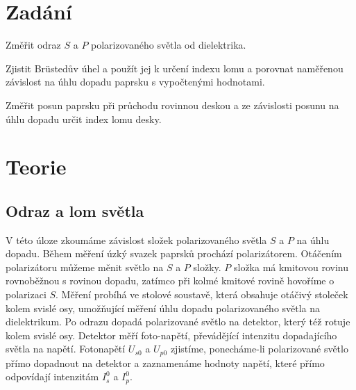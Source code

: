 \documentclass[a4paper,11pt]{article}
\begin{document}
\vskip1cm
    \begin{minipage}[t]{0.5\textwidth} 
    \section{Zadání}
    Změřit odraz $S$ a $P$ polarizovaného světla od dielektrika.
    \par Zjistit Brüstedův úhel a použít jej k určení indexu lomu a porovnat naměřenou závislost na úhlu dopadu paprsku s vypočtenými hodnotami.
    \par Změřit posun paprsku při průchodu rovinnou deskou a ze závislosti posunu na úhlu dopadu určit index lomu desky.
    \section{Teorie}
        \subsection{Odraz a lom světla}
            V této úloze zkoumáme závislost složek polarizovaného světla $S$ a $P$ na úhlu dopadu. Během měření úzký svazek paprsků prochází polarizátorem. Otáčením polarizátoru můžeme měnit světlo na $S$ a $P$ složky. $P$ složka má kmitovou rovinu rovnoběžnou s rovinou dopadu, zatímco při kolmé kmitové rovině hovoříme o polarizaci $S$. Měření probíhá ve stolové soustavě, která obsahuje otáčivý stoleček kolem svislé osy, umožňující měření úhlu dopadu polarizovaného světla na dielektrikum. Po odrazu dopadá polarizované světlo na detektor, který též rotuje kolem svislé osy. Detektor měří foto-napětí, převádějící intenzitu dopadajícího světla na napětí. Fotonapětí $U_{s0}$ a $U_{p0}$ zjistíme, ponecháme-li polarizované světlo přímo dopadnout na detektor a zaznamenáme hodnoty napětí, které přímo odpovídají intenzitám $I_s^0$ a $I_p^0$.
    \end{minipage}
    \hspace{10pt}
\end{document}
